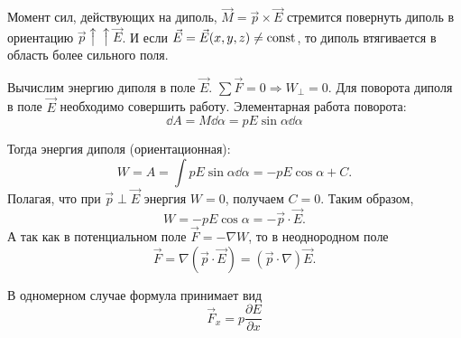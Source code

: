     Момент сил, действующих на диполь, \( \vec{M} = \vec{p}\times\vec{E} \) 
    стремится повернуть диполь в ориентацию
    \( \vec{p} \uparrow\uparrow \vec{E} \). И если \( \vec{E} = \vec{E}(x,y,z)
    \ne \mathrm{const} \), то диполь втягивается в область более сильного поля.
    
    Вычислим энергию диполя в поле \( \vec{E} \).
    \( \sum\vec{F} = 0 \Rightarrow W_{\perp} = 0 \). Для поворота диполя в поле 
    \( \vec{E} \) необходимо совершить работу. Элементарная работа поворота:
    \[
        \dd A = M\dd\alpha = pE\sin\alpha \dd\alpha
    \]
    
    Тогда энергия диполя (ориентационная):
    \[
        W = A = \int pE\sin\alpha \dd\alpha = -pE\cos\alpha + C.
    \]
    Полагая, что при \( \vec{p} \perp \vec{E} \) энергия \( W = 0 \), получаем 
    \( C = 0 \). Таким образом,
    \begin{equation}
        W = -pE\cos\alpha = -\vec{p} \cdot \vec{E}.
    \end{equation}
    А так как в потенциальном поле \( \vec{F} = -\nabla W \), то в неоднородном 
    поле
    \[
        \vec{F} = \nabla(\vec{p}\cdot\vec{E}) = (\vec{p}\cdot\nabla)\vec{E}.
    \]
    
    В одномерном случае формула принимает вид
    \begin{equation}
        \vec{F}_x = p\frac{\partial E}{\partial x}
    \end{equation}
